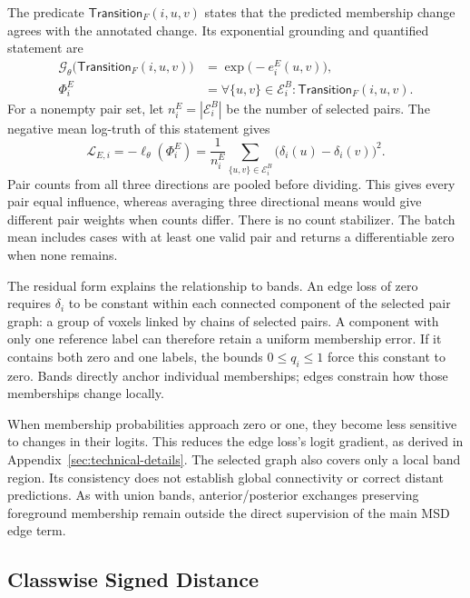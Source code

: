 \documentclass[12pt,a4paper]{article}
\begin{document}
The predicate $\mathsf{Transition}_F(i,u,v)$ states that the predicted
membership change agrees with the annotated change. Its exponential
grounding and quantified statement are
\begin{equation}
\begin{aligned}
\mathcal{G}_{\theta}\bigl(\mathsf{Transition}_{F}(i,u,v)\bigr)
 &=\exp\bigl(-e_i^E(u,v)\bigr),\\
\Phi_i^E
 &=\forall\{u,v\}\in\mathcal{E}_i^B:
     \mathsf{Transition}_{F}(i,u,v).
\end{aligned}
\label{eq:edge-logical-statement}
\end{equation}
For a nonempty pair set, let $n_i^E=|\mathcal E_i^B|$ be the number
of selected pairs. The negative mean log-truth of this statement gives
\begin{equation}
\mathcal{L}_{E,i}
=-\ell_{\theta}(\Phi_i^E)
=\frac{1}{n_i^E}\sum_{\{u,v\}\in\mathcal{E}_i^B}
   \bigl(\delta_i(u)-\delta_i(v)\bigr)^2.
\label{eq:edge-case-loss}
\end{equation}
Pair counts from all three directions
are pooled before dividing. This gives every pair equal influence,
whereas averaging three directional means would give different pair
weights when counts differ. There is no count stabilizer. The batch
mean includes cases with at least one valid pair and returns a
differentiable zero when none remains.

The residual form explains the relationship to bands. An edge loss of zero
requires $\delta_i$ to be constant within each connected component of the
selected pair graph: a group of voxels linked by chains of selected pairs. A
component with only one reference label can therefore retain a uniform
membership error. If it contains both zero and one labels, the bounds $0\leq
q_i\leq1$ force this constant to zero. Bands directly anchor individual
memberships; edges constrain how those memberships change locally.

When membership probabilities approach zero or one, they become less
sensitive to changes in their logits. This reduces the edge loss's logit
gradient, as derived in Appendix~\ref{sec:technical-details}. The selected
graph also covers only a local band region. Its consistency does not
establish global connectivity or correct distant predictions. As with union
bands, anterior/posterior exchanges preserving foreground membership remain
outside the direct supervision of the main MSD edge term.

\subsection{Classwise Signed Distance}\label{sec:sdf-constraints}
\end{document}
